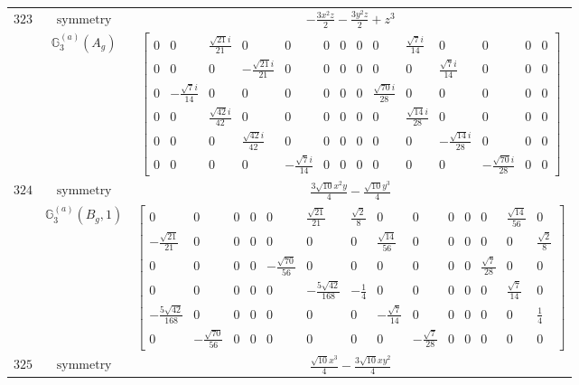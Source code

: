 \documentclass[fleqn,8pt,landscape]{jsarticle}
\begin{document}
\begin{longtable}{ccc}
$ 323 $ & $ \text{symmetry} $ & $ - \frac{3 x^{2} z}{2} - \frac{3 y^{2} z}{2} + z^{3} $ \\
$  $ & $ \mathbb{G}_{3}^{(a)}(A_{g}) $ & $ \begin{bmatrix} 0 & 0 & \frac{\sqrt{21} i}{21} & 0 & 0 & 0 & 0 & 0 & 0 & \frac{\sqrt{7} i}{14} & 0 & 0 & 0 & 0 \\ 0 & 0 & 0 & - \frac{\sqrt{21} i}{21} & 0 & 0 & 0 & 0 & 0 & 0 & \frac{\sqrt{7} i}{14} & 0 & 0 & 0 \\ 0 & - \frac{\sqrt{7} i}{14} & 0 & 0 & 0 & 0 & 0 & 0 & \frac{\sqrt{70} i}{28} & 0 & 0 & 0 & 0 & 0 \\ 0 & 0 & \frac{\sqrt{42} i}{42} & 0 & 0 & 0 & 0 & 0 & 0 & \frac{\sqrt{14} i}{28} & 0 & 0 & 0 & 0 \\ 0 & 0 & 0 & \frac{\sqrt{42} i}{42} & 0 & 0 & 0 & 0 & 0 & 0 & - \frac{\sqrt{14} i}{28} & 0 & 0 & 0 \\ 0 & 0 & 0 & 0 & - \frac{\sqrt{7} i}{14} & 0 & 0 & 0 & 0 & 0 & 0 & - \frac{\sqrt{70} i}{28} & 0 & 0 \end{bmatrix} $ \\ \hline
$ 324 $ & $ \text{symmetry} $ & $ \frac{3 \sqrt{10} x^{2} y}{4} - \frac{\sqrt{10} y^{3}}{4} $ \\
$  $ & $ \mathbb{G}_{3}^{(a)}(B_{g},1) $ & $ \begin{bmatrix} 0 & 0 & 0 & 0 & 0 & \frac{\sqrt{21}}{21} & \frac{\sqrt{2}}{8} & 0 & 0 & 0 & 0 & 0 & \frac{\sqrt{14}}{56} & 0 \\ - \frac{\sqrt{21}}{21} & 0 & 0 & 0 & 0 & 0 & 0 & \frac{\sqrt{14}}{56} & 0 & 0 & 0 & 0 & 0 & \frac{\sqrt{2}}{8} \\ 0 & 0 & 0 & 0 & - \frac{\sqrt{70}}{56} & 0 & 0 & 0 & 0 & 0 & 0 & \frac{\sqrt{7}}{28} & 0 & 0 \\ 0 & 0 & 0 & 0 & 0 & - \frac{5 \sqrt{42}}{168} & - \frac{1}{4} & 0 & 0 & 0 & 0 & 0 & \frac{\sqrt{7}}{14} & 0 \\ - \frac{5 \sqrt{42}}{168} & 0 & 0 & 0 & 0 & 0 & 0 & - \frac{\sqrt{7}}{14} & 0 & 0 & 0 & 0 & 0 & \frac{1}{4} \\ 0 & - \frac{\sqrt{70}}{56} & 0 & 0 & 0 & 0 & 0 & 0 & - \frac{\sqrt{7}}{28} & 0 & 0 & 0 & 0 & 0 \end{bmatrix} $ \\ \hline
$ 325 $ & $ \text{symmetry} $ & $ \frac{\sqrt{10} x^{3}}{4} - \frac{3 \sqrt{10} x y^{2}}{4} $ \\

\end{longtable}
\end{document}
